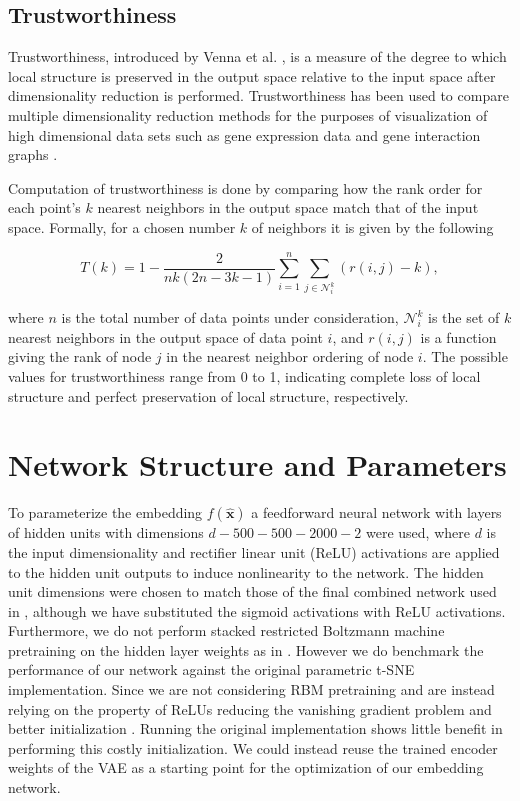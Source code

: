 \subsection{Trustworthiness}

Trustworthiness, introduced by Venna et al. \cite{trustworthiness}, is a measure of the degree to which local structure is preserved in the output space relative to the input space after dimensionality reduction is performed. Trustworthiness has been used to compare multiple dimensionality reduction methods for the purposes of visualization of high dimensional data sets such as gene expression data \cite{trustworthiness_gene_expression} and gene interaction graphs \cite{trustworthiness_gene_interaction}.

Computation of trustworthiness is done by comparing how the rank order for each point's $k$ nearest neighbors in the output space match that of the input space. Formally, for a chosen number $k$ of neighbors it is given by the following 

$$T(k) = 1 - \frac{2}{nk (2n - 3k - 1)} \sum^{n}_{i=1} \sum_{j \in \mathcal{N}_{i}^{k}} (r(i, j) - k),$$

where $n$ is the total number of data points under consideration, $\mathcal{N}_{i}^{k}$ is the set of $k$ nearest neighbors in the output space of data point $i$, and $r(i, j)$ is a function giving the rank of node $j$ in the nearest neighbor ordering of node $i$. The possible values for trustworthiness range from 0 to 1, indicating complete loss of local structure and perfect preservation of local structure, respectively.

\section{Network Structure and Parameters}

To parameterize the embedding $f(\mathbf{\hat{x}})$ a feedforward neural network with layers of hidden units with dimensions $d - 500 - 500 - 2000 - 2$ were used, where $d$ is the input dimensionality and rectifier linear unit (ReLU) activations are applied to the hidden unit outputs to induce nonlinearity to the network. The hidden unit dimensions were chosen to match those of the final combined network used in \cite{parametric_tsne}, although we have substituted the sigmoid activations with ReLU activations. Furthermore, we do not perform stacked restricted Boltzmann machine pretraining on the hidden layer weights as in \cite{parametric_tsne}. However we do benchmark the performance of our network against the original parametric t-SNE implementation. Since we are not considering RBM pretraining and are instead relying on the property of ReLUs reducing the vanishing gradient problem \cite{relu} and better initialization \cite{xavier_initializer}. Running the original implementation shows little benefit in performing this costly initialization. We could instead reuse the trained encoder weights of the VAE as a starting point for the optimization of our embedding network.

